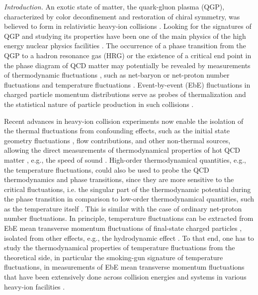 \documentclass[aps,twocolumn,prd,superscriptaddress,nofootinbib,floatfix]{revtex4-2}
\begin{document}
\textit{Introduction.}\label{sec:introduction} 
An exotic state of matter, the quark-gluon plasma (QGP), characterized by color deconfinement and restoration of chiral symmetry, was believed to form in relativistic heavy-ion collisions \cite{Shuryak:1980tp, Harris:1996zx}. Looking for the signatures of QGP and studying its properties have been one of the main physics of the high energy nuclear physics facilities \cite{STAR:2005gfr, PHENIX:2004vcz, ALICE:2005vhb, Busza:2018rrf, STAR:2023jdd}. The occurrence of a phase transition from the QGP to a hadron resonance gas (HRG) or the existence of a critical end point in the phase diagram of QCD matter \cite{Stephanov:1998dy, Stephanov:1999zu, Fu:2019hdw, Gao:2020fbl, Gunkel:2021oya} may potentially be revealed by measurements of thermodynamic fluctuations \cite{STAR:2010vob, Bzdak:2019pkr, Chen:2024aom}, such as net-baryon or net-proton number fluctuations \cite{STAR:2020tga, STAR:2021fge, STAR:2022vlo, STAR:2022etb, STAR:2025zdq, Fu:2016tey, Fu:2021oaw, Fu:2023lcm, Lu:2025cls} and temperature fluctuations \cite{Gavin:2003cb}. Event-by-event (EbE) fluctuations in charged particle momentum distributions serve as probes of thermalization and the statistical nature of particle production in such collisions \cite{Heiselberg:2000fk, Jeon:2000wg, Voloshin:1999yf, Asakawa:2000wh,Stodolsky:1995ds}.  

Recent advances in heavy-ion collision experiments now enable the isolation of the thermal fluctuations from confounding effects, such as the initial state geometry fluctuations \cite{Gardim:2011xv, Schenke:2014tga, STAR:2024wgy, ATLAS:2024jvf, Zhang:2025yyd}, flow contributions, and other non-thermal sources, allowing the direct measurements of thermodynamical properties of hot QCD matter \cite{Gardim:2019xjs}, e.g., the speed of sound \cite{Gardim:2019brr, Gardim:2024zvi, CMS:2024sgx}. High-order thermodynamical quantities, e.g., the temperature fluctuations, could also be used to probe the QCD thermodynamics and phase transitions, since they are more sensitive to the critical fluctuations, i.e. the singular part of the thermodynamic potential during the phase transition in comparison to low-order thermodynamical quantities, such as the temperature itself \cite{NA60:2008dcb, HADES:2019auv, Churchill:2023zkk, STAR:2024bpc}. This is similar with the case of ordinary net-proton number fluctuations. In principle, temperature fluctuations can be extracted from EbE mean transverse momentum fluctuations of final-state charged particles \cite{Gavin:2003cb}, isolated from other effects, e.g., the hydrodynamic effect \cite{Giacalone:2020lbm}. To that end, one has to study the thermodynamical properties of temperature fluctuations from the theoretical side, in particular the smoking-gun signature of temperature fluctuations, in measurements of EbE mean transverse momentum fluctuations that have been extensively done across collision energies and systems in various heavy-ion facilities \cite{NA49:1999inh, CERES:2003sap, PHENIX:2003ccl, STAR:2005vxr, NA49:2008fag, ALICE:2023tej, ATLAS:2024jvf}. 
\end{document}
